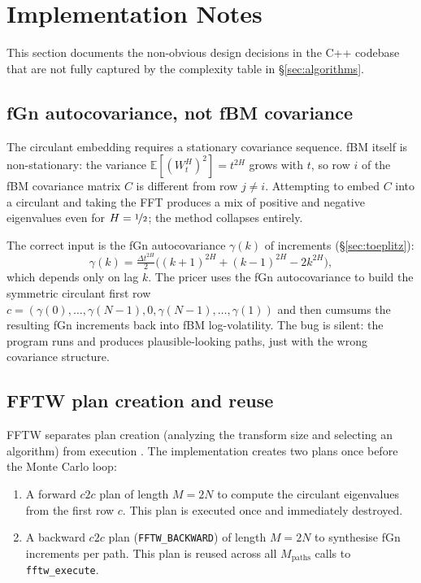 \section{Implementation Notes}
\label{sec:implementation}

This section documents the non-obvious design decisions in the C++ codebase
that are not fully captured by the complexity table in §\ref{sec:algorithms}.

\subsection{fGn autocovariance, not fBM covariance}
\label{sec:fgn-choice}

The circulant embedding requires a stationary covariance sequence.
fBM itself is non-stationary: the variance $\mathbb{E}[(W_t^H)^2] = t^{2H}$
grows with $t$, so row $i$ of the fBM covariance matrix $C$ is different from
row $j \neq i$.  Attempting to embed $C$ into a circulant and taking the FFT
produces a mix of positive and negative eigenvalues even for $H = \nicefrac{1}{2}$;
the method collapses entirely.

The correct input is the fGn autocovariance $\gamma(k)$ of increments
(§\ref{sec:toeplitz}):
\begin{equation}
  \gamma(k)
  = \tfrac{\Delta t^{2H}}{2}\bigl((k{+}1)^{2H} + (k{-}1)^{2H} - 2k^{2H}\bigr),
\end{equation}
which depends only on lag $k$.  The pricer uses the fGn autocovariance to
build the symmetric circulant first row
$c = (\gamma(0), \ldots, \gamma(N{-}1), 0, \gamma(N{-}1), \ldots, \gamma(1))$
and then cumsums the resulting fGn increments back into fBM log-volatility.
The bug is silent: the program runs and produces plausible-looking paths, just
with the wrong covariance structure.

\subsection{FFTW plan creation and reuse}
\label{sec:fftw-plans}

FFTW separates plan creation (analyzing the transform size and
selecting an algorithm) from execution \citep{frigo2005design}.
The implementation creates two plans once before the Monte Carlo loop:

\begin{enumerate}
  \item A forward $c2c$ plan of length $M = 2N$ to compute the circulant
        eigenvalues from the first row $c$.  This plan is executed once and
        immediately destroyed.
  \item A backward $c2c$ plan (\texttt{FFTW\_BACKWARD}) of length $M = 2N$
        to synthesise fGn increments per path.  This plan is reused across
        all $M_\mathrm{paths}$ calls to \texttt{fftw\_execute}.
\end{enumerate}

